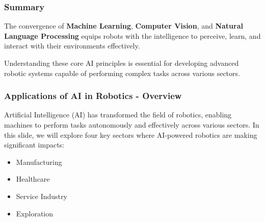 \documentclass[aspectratio=169]{beamer}
\begin{document}
\begin{frame}[fragile]
    \frametitle{Summary}
    The convergence of \textbf{Machine Learning}, \textbf{Computer Vision}, and \textbf{Natural Language Processing} equips robots with the intelligence to perceive, learn, and interact with their environments effectively.
    
    Understanding these core AI principles is essential for developing advanced robotic systems capable of performing complex tasks across various sectors.
\end{frame}

\begin{frame}[fragile]
    \frametitle{Applications of AI in Robotics - Overview}
    Artificial Intelligence (AI) has transformed the field of robotics, enabling machines to perform tasks autonomously and effectively across various sectors. In this slide, we will explore four key sectors where AI-powered robotics are making significant impacts:
    \begin{itemize}
        \item Manufacturing
        \item Healthcare
        \item Service Industry
        \item Exploration
    \end{itemize}
\end{frame}
\end{document}
